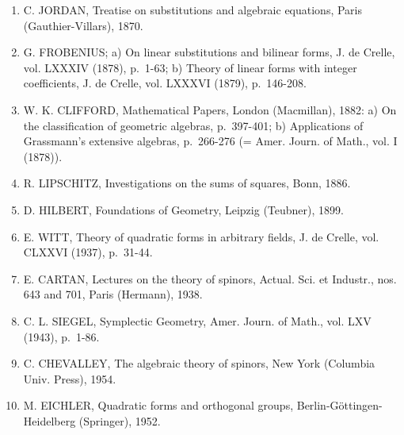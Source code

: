 \begin{enumerate}
\item
  C. JORDAN, Treatise on substitutions and algebraic equations, Paris (Gauthier-Villars), 1870.
\item
  G. FROBENIUS; a) On linear substitutions and bilinear forms, J. de Crelle, vol. LXXXIV (1878), p.~1-63; b) Theory of linear forms with integer coefficients, J. de Crelle, vol. LXXXVI (1879), p.~146-208.
\item
  W. K. CLIFFORD, Mathematical Papers, London (Macmillan), 1882: a) On the classification of geometric algebras, p.~397-401; b) Applications of Grassmann's extensive algebras, p.~266-276 (= Amer. Journ. of Math., vol. I (1878)).
\item
  R. LIPSCHITZ, Investigations on the sums of squares, Bonn, 1886.
\item
  D. HILBERT, Foundations of Geometry, Leipzig (Teubner), 1899.
\item
  E. WITT, Theory of quadratic forms in arbitrary fields, J. de Crelle, vol. CLXXVI (1937), p.~31-44.
\item
  E. CARTAN, Lectures on the theory of spinors, Actual. Sci. et Industr., nos. 643 and 701, Paris (Hermann), 1938.
\item
  C. L. SIEGEL, Symplectic Geometry, Amer. Journ. of Math., vol. LXV (1943), p.~1-86.
\item
  C. CHEVALLEY, The algebraic theory of spinors, New York (Columbia Univ. Press), 1954.
\item
  M. EICHLER, Quadratic forms and orthogonal groups, Berlin-Göttingen-Heidelberg (Springer), 1952.
\end{enumerate}

